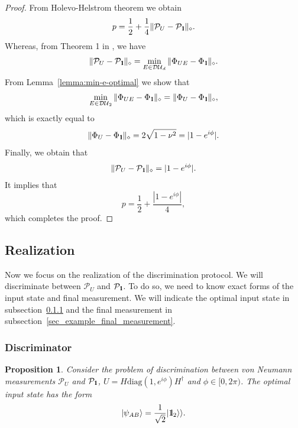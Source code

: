 \documentclass[preprint,12pt, a4paper]{elsarticle}
\newcommand{\ket}[1]{\ensuremath{|#1\rangle}}
\newcommand{\1}{{\rm 1\hspace{-0.9mm}l}}
\newcommand{\Id}{{\rm 1\hspace{-0.9mm}l}}
\newcommand{\PP}{\mathcal{P}}
\newcommand{\diaguni}{\ensuremath{\mathcal{DU}}}
\newcommand{\diag}{\mathrm{diag}}
\newtheorem{proposition}{Proposition}
\begin{document}
\begin{proof}
	From Holevo-Helstrom theorem we obtain
	\begin{equation}
	p = \frac{1}{2} + \frac{1}{4} \| \PP_{U} - \PP_{\Id} \|_\diamond.
	\end{equation}
	Whereas, from Theorem 1 in \cite{puchala2018strategies}, we have 
	\begin{equation}
	\|\PP_U - \PP_\Id\|_\diamond = \min_{E \in \diaguni_d} \|\Phi_{UE} - 
	\Phi_\Id\|_\diamond. 
	\end{equation}
	From Lemma~\ref{lemma:min-e-optimal} we show that 
	\begin{equation}
		\min_{E \in \diaguni_2} \|\Phi_{UE} - 
	\Phi_\Id\|_\diamond = \|\Phi_{U} - 
	\Phi_\Id\|_\diamond,
	\end{equation} which is exactly equal to 
	\begin{equation}
	\|\Phi_{U} - 
	\Phi_\Id\|_\diamond = 2\sqrt{1 - \nu^2} = |1-e^{i   \phi }|. 
	\end{equation}
	Finally, we obtain that
	\begin{equation}
	\| \PP_{U} - \PP_{\Id} \|_\diamond =  |1-e^{i   \phi }|.
	\end{equation}
	It implies that
	\begin{equation}
	p  = \frac{1}{2} + \frac{|1-e^{i \phi}|}{4},
	\end{equation} which completes the proof.
\end{proof}





\subsection{Realization}\label{sec:example_realization}
Now we focus on the realization of the discrimination protocol. We will 
discriminate between $\PP_U$ and $\PP_\1$. To do so, we need to know exact 
forms of the input state and final measurement. We will indicate the optimal 
input state in subsection~\ref{sec:example_discriminator} and the final 
measurement in subsection~\ref{sec_example_final_measurement}.


\subsubsection{Discriminator}\label{sec:example_discriminator}

\begin{proposition}
Consider the problem of discrimination between von Neumann measurements $\PP_U$ 
and $\PP_\1$, $U = H\diag(1, e^{i \phi}) H^\dagger $ and $\phi \in [0, 
2\pi)$.  The optimal input state has the form
\begin{equation}
\ket{\psi_{AB}} = \frac{1}{\sqrt{2}} |\Id_2 \rangle \rangle.
\end{equation}
\end{proposition}
\end{document}

